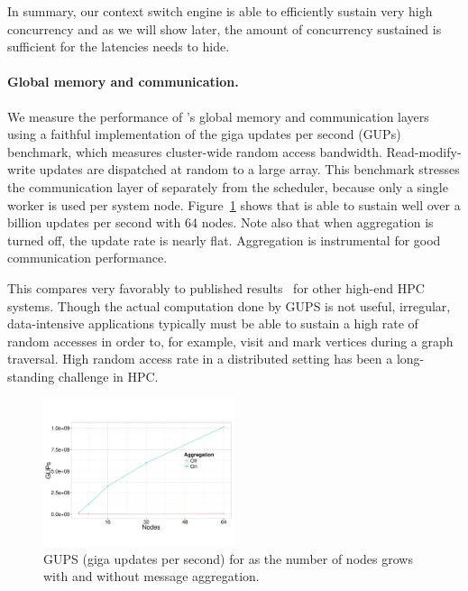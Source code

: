 In summary, our context switch engine is able to efficiently sustain very high
concurrency and as we will show later, the amount of concurrency sustained is
sufficient for the latencies \Grappa needs to hide.

\paragraph{Global memory and communication.} We measure the performance of
\Grappa's global memory and communication layers using a faithful
implementation of the giga updates per second (GUPs) benchmark, which measures cluster-wide random access bandwidth.
Read-modify-write updates are dispatched at random to a large array. This
benchmark stresses the communication layer of \Grappa separately from the
scheduler, because only a single worker is used per system node.
Figure~\ref{fig:grappa-gups} shows that \Grappa is able to sustain well over a
billion updates per second with 64 nodes. Note also that when aggregation is turned off, the update rate is nearly flat. Aggregation is instrumental for good communication performance.

This compares very favorably to published results~\cite{gups} for other
high-end HPC systems. Though the actual computation done by GUPS is not 
useful, irregular, data-intensive applications typically must be able to
sustain a high rate of random accesses in order to, for example, visit and
mark vertices during a graph traversal. High random access rate in a
distributed setting has been a long-standing challenge in HPC.

\begin{figure}[ht]
    \begin{center}
      \includegraphics[width=0.5\textwidth]{figs/gups.pdf}
    \end{center}
    \caption{GUPS (giga updates per second) for \Grappa as the number of nodes grows with and without message aggregation.}
    \label{fig:grappa-gups}
\end{figure}

